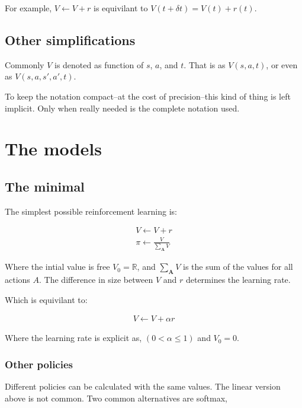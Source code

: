 \documentclass[8pt]{article}
\begin{document}
\begin{multicols}{4}
For example, $V \leftarrow V + r$ is equivilant to $V(t+\delta t) = V(t) + r(t)$.

\subsection*{Other simplifications}

Commonly $V$ is denoted as function of $s$, $a$, and $t$. That is as $V(s,a,t)$, or even as $V(s,a, s', a', t)$.

To keep the notation compact--at the cost of precision--this kind of thing is left implicit. Only when really needed is the complete notation used. 


\section*{The models}
\subsection*{The minimal}

The simplest possible reinforcement learning is:

\begin{eqnarray}
    V \leftarrow V + r \\
    \pi \leftarrow \frac{V}{\sum_\textbf{A}{V}} 
\end{eqnarray}

Where the intial value is free $V_0 = \mathbb{R}$, and $\sum_\textbf{A}{V}$ is the sum of the values for all actions $A$. The difference in size between $V$ and $r$ determines the learning rate. 

Which is equivilant to:

\begin{eqnarray}
    V \leftarrow V + \alpha r 
\end{eqnarray}

Where the learning rate is explicit as, $(0 < \alpha \leq 1)$ and $V_0 = 0$.

\subsubsection*{Other policies}

Different policies can be calculated with the same values. The linear version above is not common. Two common alternatives are softmax,


\end{multicols}
\end{document}
